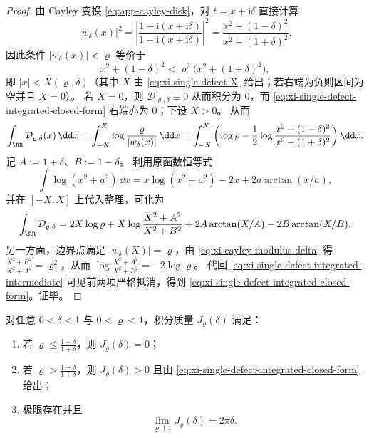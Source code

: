 \begin{proof}
由 Cayley 变换 \eqref{eq:app-cayley-disk}，对 \(t=x+\mathrm{i}\delta\) 直接计算
\begin{equation}\label{eq:xi-cayley-modulus-delta}
|w_\delta(x)|^2
=\left|\frac{1+\mathrm{i}(x+\mathrm{i}\delta)}{1-\mathrm{i}(x+\mathrm{i}\delta)}\right|^2
=\frac{x^2+(1-\delta)^2}{x^2+(1+\delta)^2}.
\end{equation}
因此条件 \(|w_\delta(x)|<\varrho\) 等价于
\[
x^2+(1-\delta)^2<\varrho^2\bigl(x^2+(1+\delta)^2\bigr),
\]
即 \(|x|<X(\varrho,\delta)\)（其中 \(X\) 由 \eqref{eq:xi-single-defect-X} 给出；若右端为负则区间为空并且 \(X=0\)）。
若 \(X=0\)，则 \(\mathcal{D}_{\varrho,\delta}\equiv 0\) 从而积分为 \(0\)，而 \eqref{eq:xi-single-defect-integrated-closed-form} 右端亦为 \(0\)；下设 \(X>0\)。
从而
\[
\int_{\RR}\mathcal{D}_{\varrho,\delta}(x)\,\dd x
=\int_{-X}^{X}\log\frac{\varrho}{|w_\delta(x)|}\,\dd x
=\int_{-X}^{X}\left(\log\varrho-\frac12\log\frac{x^2+(1-\delta)^2}{x^2+(1+\delta)^2}\right)\dd x.
\]
记 \(A:=1+\delta\)、\(B:=1-\delta\)。
利用原函数恒等式
\[
\int \log(x^2+a^2)\,\dd x
=x\log(x^2+a^2)-2x+2a\arctan(x/a),
\]
并在 \([-X,X]\) 上代入整理，可化为
\begin{equation}\label{eq:xi-single-defect-integrated-intermediate}
\int_{\RR}\mathcal{D}_{\varrho,\delta}
=2X\log\varrho+X\log\frac{X^2+A^2}{X^2+B^2}
+2A\arctan(X/A)-2B\arctan(X/B).
\end{equation}
另一方面，边界点满足 \(|w_\delta(X)|=\varrho\)，由 \eqref{eq:xi-cayley-modulus-delta} 得
\(
\frac{X^2+B^2}{X^2+A^2}=\varrho^2
\)，从而
\(
\log\frac{X^2+A^2}{X^2+B^2}=-2\log\varrho
\)。
代回 \eqref{eq:xi-single-defect-integrated-intermediate} 可见前两项严格抵消，得到 \eqref{eq:xi-single-defect-integrated-closed-form}。证毕。
\end{proof}

\begin{corollary}[阈值不可见性与端点饱和]\label{cor:xi-single-defect-threshold-saturation}
对任意 \(0<\delta<1\) 与 \(0<\varrho<1\)，积分质量 \(J_{\varrho}(\delta)\) 满足：
\begin{enumerate}
  \item 若 \(\varrho\le \frac{1-\delta}{1+\delta}\)，则 \(J_{\varrho}(\delta)=0\)；
  \item 若 \(\varrho> \frac{1-\delta}{1+\delta}\)，则 \(J_{\varrho}(\delta)>0\) 且由 \eqref{eq:xi-single-defect-integrated-closed-form} 给出；
  \item 极限存在并且
  \begin{equation}\label{eq:xi-single-defect-saturation}
  \boxed{\;\lim_{\varrho\uparrow 1}J_{\varrho}(\delta)=2\pi\delta.\;}
  \end{equation}
\end{enumerate}
\end{corollary}

